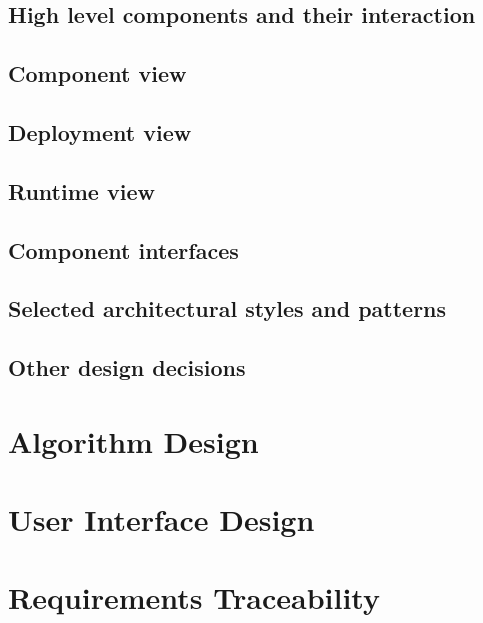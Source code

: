 \documentclass[18pt,oneside,a4paper, titlepage]{article}
\begin{document}
		\subsection{High level components and their interaction}
		\subsection{Component view}
		\subsection{Deployment view}
		\subsection{Runtime view}
		
		\subsection{Component interfaces}
		\subsection{Selected architectural styles and patterns}
			
		\subsection{Other design decisions}
		
	\section{Algorithm Design}
		
	\section{User Interface Design}
		
	\section{Requirements Traceability}
\end{document}
